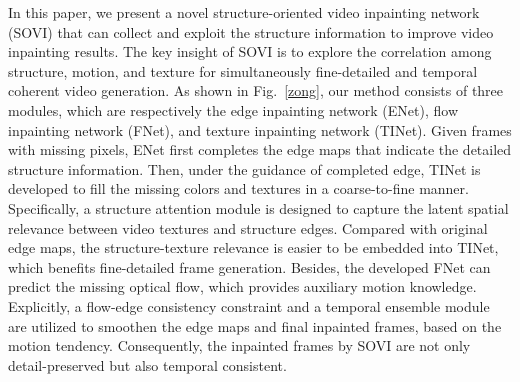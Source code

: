 In this paper, we present a novel structure-oriented video inpainting network (SOVI) that can collect and exploit the structure information to improve video inpainting results. %
The key insight of SOVI is to explore the correlation among structure, motion, and texture for simultaneously fine-detailed and temporal coherent video generation. %
As shown in Fig.~\ref{zong}, our method consists of three modules, which are respectively the edge inpainting network (ENet), flow inpainting network (FNet), and texture inpainting network (TINet).
Given frames with missing pixels, ENet first completes the edge maps that indicate the detailed structure information. Then, under the guidance of completed edge, TINet is developed to fill the missing colors and textures in a coarse-to-fine manner.
Specifically, a structure attention module is designed to capture the latent spatial relevance between video textures and structure edges.
Compared with original edge maps, the structure-texture relevance is easier to be embedded into TINet, which benefits fine-detailed frame generation.
Besides, the developed FNet can predict the missing optical flow, which provides auxiliary motion knowledge. Explicitly, a flow-edge consistency constraint and a temporal ensemble module are utilized to smoothen the edge maps and final inpainted frames, based on the motion tendency. Consequently, the inpainted frames by SOVI are not only detail-preserved but also temporal consistent.



